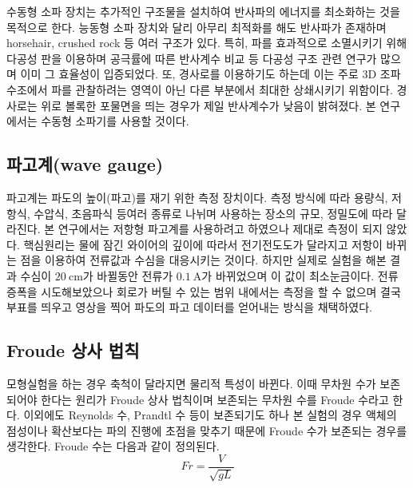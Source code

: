 
수동형 소파 장치는 추가적인 구조물을 설치하여 반사파의 에너지를 최소화하는 것을 목적으로 한다. 능동형 소파 장치와 달리 아무리 최적화를 해도 반사파가 존재하며 horsehair, crushed rock 등 여러 구조가 있다. 특히, 파를 효과적으로 소멸시키기 위해 다공성 판을 이용하며 공극률에 따른 반사계수 비교 등 다공성 구조 관련 연구가 많으며 이미 그 효율성이 입증되었다\cite{lim2014optimum, o2017methods}. 또, 경사로를 이용하기도 하는데 이는 주로 3D 조파 수조에서 파를 관찰하려는 영역이 아닌 다른 부분에서 최대한 상쇄시키기 위함이다. 경사로는 위로 볼록한 포물면을 띄는 경우가 제일 반사계수가 낮음이 밝혀졌다. 본 연구에서는 수동형 소파기를 사용할 것이다.

\subsection{파고계(wave gauge)}

파고계는 파도의 높이(파고)를 재기 위한 측정 장치이다. 측정 방식에 따라 용량식, 저항식, 수압식, 초음파식 등여러 종류로 나뉘며 사용하는 장소의 규모, 정밀도에 따라 달라진다. 본 연구에서는 저항형 파고계를 사용하려고 하였으나 제대로 측정이 되지 않았다. 핵심원리는 물에 잠긴 와이어의 깊이에 따라서 전기전도도가 달라지고 저항이 바뀌는 점을 이용하여 전류값과 수심을 대응시키는 것이다. 하지만 실제로 실험을 해본 결과 수심이 $20\mathrm{~cm}$가 바뀔동안 전류가 $0.1\mathrm{~A}$가 바뀌었으며 이 값이 최소눈금이다. 전류 증폭을 시도해보았으나 회로가 버틸 수 있는 범위 내에서는 측정을 할 수 없으며 결국 부표를 띄우고 영상을 찍어 파도의 파고 데이터를 얻어내는 방식을 채택하였다.

\subsection{Froude 상사 법칙}
모형실험을 하는 경우 축척이 달라지면 물리적 특성이 바뀐다. 이때 무차원 수가 보존되어야 한다는 원리가 Froude 상사 법칙이며 보존되는 무차원 수를 Froude 수라고 한다.\cite{briggs2013basics, chakrabarti1994offshore} 이외에도 Reynolds 수, Prandtl 수 등이 보존되기도 하나 본 실험의 경우 액체의 점성이나 확산보다는 파의 진행에 초점을 맞추기 때문에 Froude 수가 보존되는 경우를 생각한다. Froude 수는 다음과 같이 정의된다.
\begin{equation}
    Fr = \frac{V}{\sqrt{gL}}
\end{equation}

